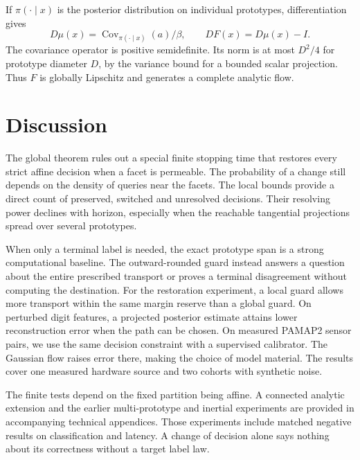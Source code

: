 \documentclass[10pt]{article}
\newcommand{\Cov}{\operatorname{Cov}}
\begin{document}
If $\pi(\cdot\mid x)$ is the posterior distribution on individual
prototypes, differentiation gives
\begin{equation}
 D\mu(x)=\Cov_{\pi(\cdot\mid x)}(a)/\beta,\qquad DF(x)=D\mu(x)-I .
 \label{eq:covariance}
\end{equation}
The covariance operator is positive semidefinite. Its norm is at most
$D^2/4$ for prototype diameter $D$, by the variance bound for a bounded
scalar projection. Thus $F$ is globally Lipschitz and generates a complete
analytic flow.











\section{Discussion}
The global theorem rules out a special finite stopping time that
restores every strict affine decision when a facet is permeable.
The probability of a change still depends on the density of queries
near the facets. The local bounds provide a direct count of
preserved, switched and unresolved decisions. Their resolving power
declines with horizon, especially when the reachable tangential
projections spread over several prototypes.

When only a terminal label is needed, the exact prototype span is a
strong computational baseline. The outward-rounded guard instead
answers a question about the entire prescribed transport or proves a
terminal disagreement without computing the destination. For the
restoration experiment, a local guard allows more transport within the
same margin reserve than a global guard. On perturbed digit features,
a projected posterior estimate attains lower reconstruction error
when the path can be chosen. On measured PAMAP2 sensor pairs, we use
the same decision constraint with a supervised calibrator. The
Gaussian flow raises error there, making the choice of model material.
The results cover one measured hardware source and two cohorts with
synthetic noise.

The finite tests depend on the fixed partition being affine. A
connected analytic extension and the earlier multi-prototype and
inertial experiments are provided in accompanying technical appendices. Those experiments
include matched negative results on classification and latency. A
change of decision alone says nothing about its correctness without a
target label law.
\end{document}
